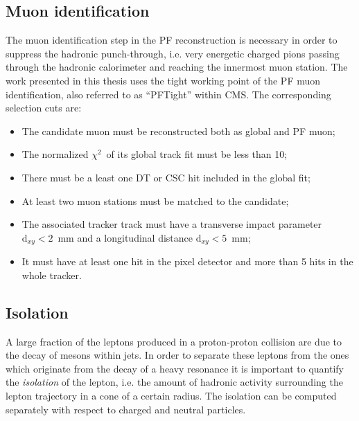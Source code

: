 \subsection{Muon identification}

The muon identification step in the PF reconstruction is necessary in order to suppress the hadronic punch-through, i.e. very energetic charged pions passing through the hadronic calorimeter and reaching the innermost muon station. %
The work presented in this thesis uses the tight working point of the PF muon identification, also referred to as ``PFTight'' within CMS.
The corresponding selection cuts are:

\begin{itemize}
\item The candidate muon must be reconstructed both as global and PF muon;
\item The normalized $\chi^2$\ of its global track fit must be less than 10;
\item There must be a least one DT or CSC hit included in the global fit;
\item At least two muon stations must be matched to the candidate;
\item The associated tracker track must have a transverse impact parameter $\mathrm{d}_{xy} < 2$~mm and a longitudinal distance $\mathrm{d}_{xy} < 5$~mm;
\item It must have at least one hit in the pixel detector and more than 5 hits in the whole tracker.
\end{itemize}

\subsection{Isolation}

A large fraction of the leptons produced in a proton-proton collision are due to the decay of mesons within jets. In order to separate these leptons from the ones which originate from the decay of a heavy resonance it is important to quantify the \emph{isolation} of the lepton, i.e. the amount of hadronic activity surrounding the lepton trajectory in a cone of a certain radius. The isolation can be computed separately with respect to charged and neutral particles. 

